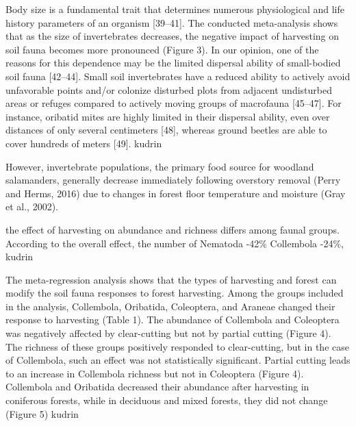   Body size is a fundamental trait that determines numerous physiological and life history parameters of an organism [39–41]. The conducted meta-analysis shows that as the size of invertebrates decreases, the negative impact of harvesting on soil fauna becomes more pronounced (Figure 3). In our opinion, one of the reasons for this dependence may be the limited dispersal ability of small-bodied soil fauna [42–44]. Small soil invertebrates have a reduced ability to actively avoid unfavorable points and/or colonize disturbed plots from adjacent undisturbed areas or refuges compared to actively moving groups of macrofauna [45–47]. For instance, oribatid mites are highly limited in their dispersal ability, even over distances of only several centimeters [48], whereas ground beetles are able to cover hundreds of meters [49]. kudrin



However, invertebrate populations, the primary food source for woodland salamanders, generally decrease immediately following overstory removal (Perry and Herms, 2016) due to changes in forest floor temperature and moisture (Gray et al., 2002).

the effect of harvesting on abundance and richness differs among faunal groups. According to the overall effect, the number of Nematoda -42\% Collembola -24\%, kudrin

The meta-regression analysis shows that the types of harvesting and forest can modify the soil fauna responses to forest harvesting. Among the groups included in the analysis, Collembola, Oribatida, Coleoptera, and Araneae changed their response to harvesting (Table 1). The abundance of Collembola and Coleoptera was negatively affected by clear-cutting but not by partial cutting (Figure 4). The richness of these groups positively responded to clear-cutting, but in the case of Collembola, such an effect was not statistically significant. Partial cutting leads to an increase in Collembola richness but not in Coleoptera (Figure 4). Collembola and Oribatida decreased their abundance after harvesting in coniferous forests, while in deciduous and mixed forests, they did not change (Figure 5) kudrin

